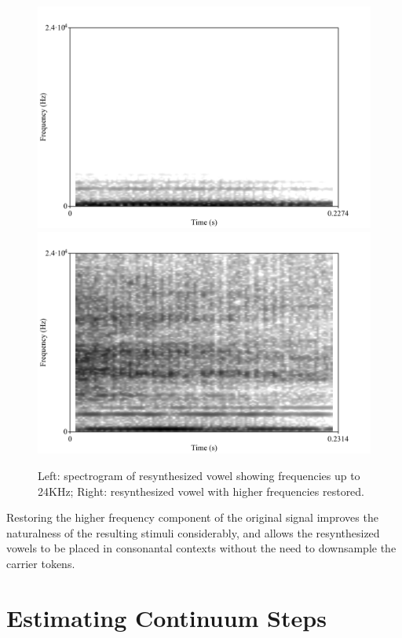 \documentclass{article}\usepackage[]{graphicx}\usepackage[]{color}
\begin{document}
\begin{figure}[!ht]
\includegraphics[scale=0.4,keepaspectratio]{vowel_LF_only.png}
\includegraphics[scale=0.4,keepaspectratio]{vowel_HF_restored.png}
\caption{Left: spectrogram of resynthesized vowel showing frequencies up to 24KHz; Right: resynthesized vowel with higher frequencies restored.}
\end{figure}

Restoring the higher frequency component of the original signal improves the naturalness of the resulting stimuli considerably, and allows the resynthesized vowels to be placed in consonantal contexts without the need to downsample the carrier tokens.

\section*{Estimating Continuum Steps}
\end{document}
